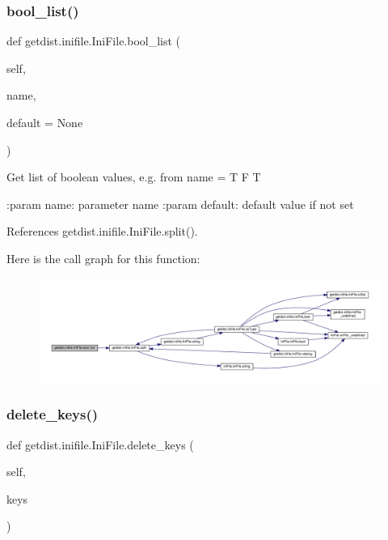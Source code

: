 \subsubsection{\texorpdfstring{bool\+\_\+list()}{bool\_list()}}
{\footnotesize\ttfamily def getdist.\+inifile.\+Ini\+File.\+bool\+\_\+list (\begin{DoxyParamCaption}\item[{}]{self,  }\item[{}]{name,  }\item[{}]{default = {\ttfamily None} }\end{DoxyParamCaption})}

\begin{DoxyVerb}Get list of boolean values, e.g. from name = T F T

:param name: parameter name
:param default: default value if not set
\end{DoxyVerb}
 

References getdist.\+inifile.\+Ini\+File.\+split().

Here is the call graph for this function\+:
\nopagebreak
\begin{figure}[H]
\begin{center}
\leavevmode
\includegraphics[width=350pt]{classgetdist_1_1inifile_1_1IniFile_a3e462a0dea71c6a61530a420c38b597b_cgraph}
\end{center}
\end{figure}
\mbox{\label{classgetdist_1_1inifile_1_1IniFile_a72c9670bb1e927aae5eb0b31dc5fc1d7}} 
\subsubsection{\texorpdfstring{delete\+\_\+keys()}{delete\_keys()}}
{\footnotesize\ttfamily def getdist.\+inifile.\+Ini\+File.\+delete\+\_\+keys (\begin{DoxyParamCaption}\item[{}]{self,  }\item[{}]{keys }\end{DoxyParamCaption})}



